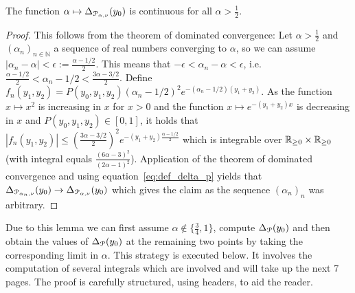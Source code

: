 \begin{lemma}\label{lem:continuity_Delta_function}
The function $\alpha \mapsto \Delta_{{\mathcal P}_{\alpha,\nu}}(y_0)$ is continuous for all $\alpha > \frac{1}{2}$.
\end{lemma}
\begin{proof}
This follows from the theorem of dominated convergence:
Let $\alpha > \frac{1}{2}$ and $(\alpha_n)_{n\in \mathbb{N}}$ a sequence of real numbers converging to $\alpha$, so we can assume $|\alpha_n - \alpha| < \epsilon := \frac{\alpha-1/2}{2}$. This means that $-\epsilon < \alpha_n - \alpha < \epsilon$, i.e. $\frac{\alpha-1/2}{2} < \alpha_n - 1/2 < \frac{3\alpha-3/2}{2}$. Define $f_n(y_1,y_2) = P(y_0,y_1,y_2) (\alpha_n - 1/2)^2 e^{-(\alpha_n-1/2)(y_1+y_2)}$. As the function $x \mapsto x^2$ is increasing in $x$ for $x>0$ and the function $x \mapsto e^{-(y_1+y_2)x}$ is decreasing in $x$ and $P(y_0,y_1,y_2) \in [0,1]$, it holds that $|f_n(y_1,y_2)| \leq (\frac{3\alpha-3/2}{2})^2e^{-(y_1+y_2)\frac{\alpha-1/2}{2}}$ which is integrable over ${\mathbb R}_{\geq 0} \times {\ensuremath{\mathbb R}}_{\geq 0}$ (with integral equals $\frac{(6\alpha-3)^2}{(2\alpha-1)^2}$). Application of the theorem of dominated convergence and using equation~\eqref{eq:def_delta_p} yields that $\Delta_{{\mathcal P}_{\alpha_n,\nu}}(y_0) \rightarrow \Delta_{{\mathcal P}_{\alpha,\nu}}(y_0)$ which gives the claim as the sequence $(\alpha_n)_n$ was arbitrary.
\end{proof}

Due to this lemma we can first assume $\alpha \notin \{ \frac{3}{4},1 \}$, compute $\Delta_{{\mathcal P}}(y_0)$ and then obtain the values of $\Delta_{{\mathcal P}}(y_0)$ at the remaining two points by taking the corresponding limit in $\alpha$. This strategy is executed below. It involves the computation of several integrals which are involved and will take up the next 7 pages. The proof is carefully structured, using headers, to aid the reader. 


